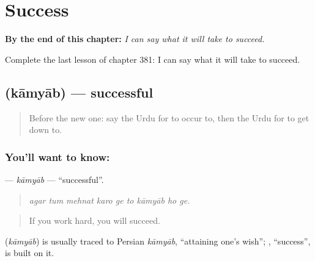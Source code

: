 
\chapter{Success}
\label{ch:ur-success}

\begin{chapteropening}
\textbf{By the end of this chapter:} \emph{I can say what it will take to succeed.}

Complete the last lesson of chapter 381: I can say what it will take to succeed.
\end{chapteropening}

\section[\texorpdfstring{\ur{کامیاب} (kāmyāb)}{کامیاب (kāmyāb)}]{ (kāmyāb) — successful}

\label{lesson:UR-C381-kamyab}



\begin{quote}
Before the new one: say the Urdu for to occur to, then the Urdu for to get down to.
\end{quote}

\subsection*{You'll want to know: }
\textbf{} — \emph{kāmyāb} — \textquotedblleft{}successful\textquotedblright{}.

\begin{quote}
        
\end{quote}

\begin{quote}
\emph{agar tum mehnat karo ge to kāmyāb ho ge.}
\end{quote}

\begin{quote}
If you work hard, you will succeed.
\end{quote}

\begin{cousinweb}
\textbf{} (\emph{kāmyāb}) is usually traced to Persian \emph{kāmyāb}, \textquotedblleft{}attaining one's wish\textquotedblright{}; \textbf{}, \textquotedblleft{}success\textquotedblright{}, is built on it.
\end{cousinweb}


